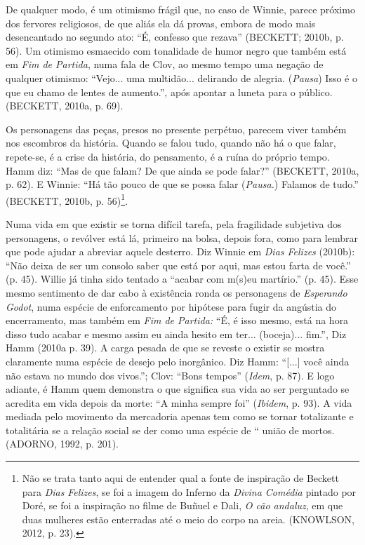 De qualquer modo, é um otimismo frágil que, no caso de Winnie, parece
próximo dos fervores religiosos, de que aliás ela dá provas, embora de
modo mais desencantado no segundo ato: ``É, confesso que rezava''
(BECKETT; 2010b, p. 56). Um otimismo esmaecido com tonalidade de humor
negro que também está em \emph{Fim de Partida}, numa fala de Clov, ao
mesmo tempo uma negação de qualquer otimismo: ``Vejo... uma multidão...
delirando de alegria. (\emph{Pausa}) Isso é o que eu chamo de lentes de
aumento.'', após apontar a luneta para o público. (BECKETT, 2010a, p.
69).

Os personagens das peças, presos no presente perpétuo, parecem viver
também nos escombros da história. Quando se falou tudo, quando não há o
que falar, repete-se, é a crise da história, do pensamento, é a ruína do
próprio tempo. Hamm diz: ``Mas de que falam? De que ainda se pode
falar?'' (BECKETT, 2010a, p. 62). E Winnie: ``Há tão pouco de que se
possa falar (\emph{Pausa.}) Falamos de tudo.'' (BECKETT, 2010b, p.
56)\footnote{Não se trata tanto aqui de entender qual a fonte de
  inspiração de Beckett para \emph{Dias} \emph{Felizes}, se foi a imagem
  do Inferno da \emph{Divina Comédia} pintado por Doré, se foi a
  inspiração no filme de Buñuel e Dali, \emph{O cão andaluz}, em que
  duas mulheres estão enterradas até o meio do corpo na areia.
  (KNOWLSON, 2012, p. 23).}.

Numa vida em que existir se torna difícil tarefa, pela fragilidade
subjetiva dos personagens, o revólver está lá, primeiro na bolsa, depois
fora, como para lembrar que pode ajudar a abreviar aquele desterro. Diz
Winnie em \emph{Dias Felizes} (2010b): ``Não deixa de ser um consolo
saber que está por aqui, mas estou farta de você.'' (p. 45). Willie já
tinha sido tentado a ``acabar com m(s)eu martírio.'' (p. 45). Esse mesmo
sentimento de dar cabo à existência ronda os personagens de
\emph{Esperando Godot}, numa espécie de enforcamento por hipótese para
fugir da angústia do encerramento, mas também em \emph{Fim de Partida:}
``É, é isso mesmo, está na hora disso tudo acabar e mesmo assim eu ainda
hesito em ter... (boceja)... fim.'', Diz Hamm (2010a p. 39). A carga
pesada de que se reveste o existir se mostra claramente numa espécie de
desejo pelo inorgânico. Diz Hamm: ``{[}...{]} você ainda não estava no
mundo dos vivos.''; Clov: ``Bons tempos'' (\emph{Idem}, p. 87). E logo
adiante, é Hamm quem demonstra o que significa sua vida ao ser
perguntado se acredita em vida depois da morte: ``A minha sempre foi''
(\emph{Ibidem}, p. 93). A vida mediada pelo movimento da mercadoria
apenas tem como se tornar totalizante e totalitária se a relação social
se der como uma espécie de `` união de mortos. (ADORNO, 1992, p. 201).


